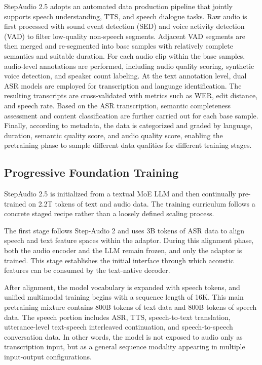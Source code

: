 \documentclass{llmxive}
\begin{document}
StepAudio 2.5 adopts an automated data production pipeline that jointly supports speech understanding, TTS, and speech dialogue tasks. Raw audio is first processed with sound event detection (SED) and voice activity detection (VAD) to filter low-quality non-speech segments. Adjacent VAD segments are then merged and re-segmented into base samples with relatively complete semantics and suitable duration. For each audio clip within the base samples, audio-level annotations are performed, including audio quality scoring, synthetic voice detection, and speaker count labeling. At the text annotation level, dual ASR models are employed for transcription and language identification. The resulting transcripts are cross-validated with metrics such as WER, edit distance, and speech rate. Based on the ASR transcription, semantic completeness assessment and content classification are further carried out for each base sample. Finally, according to metadata, the data is categorized and graded by language, duration, semantic quality score, and audio quality score, enabling the pretraining phase to sample different data qualities for different training stages.

\subsection{Progressive Foundation Training}

StepAudio 2.5 is initialized from a textual MoE LLM and then continually pre-trained on 2.2T tokens of text and audio data. The training curriculum follows a concrete staged recipe rather than a loosely defined scaling process.

The first stage follows Step-Audio 2 and uses 3B tokens of ASR data to align speech and text feature spaces within the adaptor. During this alignment phase, both the audio encoder and the LLM remain frozen, and only the adaptor is trained. This stage establishes the initial interface through which acoustic features can be consumed by the text-native decoder.

After alignment, the model vocabulary is expanded with speech tokens, and unified multimodal training begins with a sequence length of 16K. This main pretraining mixture contains 800B tokens of text data and 800B tokens of speech data. The speech portion includes ASR, TTS, speech-to-text translation, utterance-level text-speech interleaved continuation, and speech-to-speech conversation data. In other words, the model is not exposed to audio only as transcription input, but as a general sequence modality appearing in multiple input-output configurations.
\end{document}
